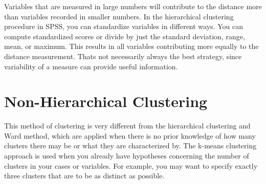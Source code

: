 Variables that are measured in large numbers will contribute to the distance more than variables recorded in smaller
numbers.
In the hierarchical clustering procedure in SPSS, you can standardize variables in
different ways. You can compute standardized scores or divide by just the standard
deviation, range, mean, or maximum. This results in all variables contributing more
equally to the distance measurement. Thats not necessarily always the best strategy,
since variability of a measure can provide useful information. 
\newpage
\section{Non-Hierarchical Clustering}
This method of clustering is very different from the hierarchical clustering and Ward method, which are applied when there is no prior knowledge of how many clusters there may be or what they are characterized by. The k-means clustering approach is used when you already have hypotheses concerning the number of clusters in your cases or variables. For example, you may want to specify exactly three clusters that are to be as distinct as possible.

